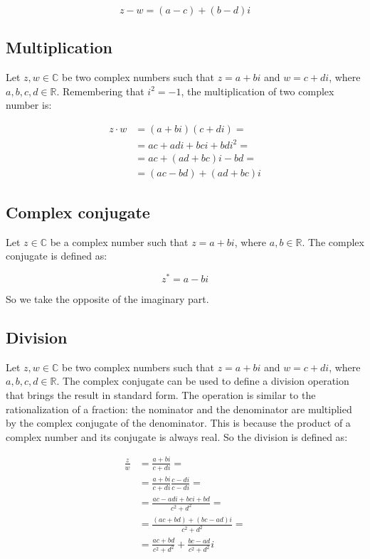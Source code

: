	$$z-w = (a-c) + (b-d)i$$

	\subsection{Multiplication}
	Let $z, w\in\mathbb{C}$ be two complex numbers such that $z = a+bi$ and $w = c+di$, where $a,b,c,d\in\mathbb{R}$.
	Remembering that $i^2 = -1$, the multiplication of two complex number is:

	\begin{align*}
		z\cdot w &= (a+bi)(c+di) = \\
						 &=ac+adi+bci+bdi^2 =\\
						 &= ac+(ad+bc)i -bd =\\
						 &= (ac-bd)+(ad+bc)i
	\end{align*}

	\subsection{Complex conjugate}
	Let $z\in\mathbb{C}$ be a complex number such that $z=a+bi$, where $a,b\in\mathbb{R}$.
	The complex conjugate is defined as:

	$$z^*=a-bi$$

	So we take the opposite of the imaginary part.

	\subsection{Division}
	Let $z, w\in\mathbb{C}$ be two complex numbers such that $z = a+bi$ and $w = c+di$, where $a,b,c,d\in\mathbb{R}$.
	The complex conjugate can be used to define a division operation that brings the result in standard form.
	The operation is similar to the rationalization of a fraction: the nominator and the denominator are multiplied by the complex conjugate of the denominator.
	This is because the product of a complex number and its conjugate is always real.
	So the division is defined as:

	\begin{align*}
		\frac{z}{w} &= \frac{a+bi}{c+di} = \\
								&=\frac{a+bi}{c+di}\frac{c-di}{c-di}=\\
								&=\frac{ac - adi + bci +bd}{c^2+d^2}=\\
								&= \frac{(ac + bd) + (bc - ad)i}{c^2+d^2} = \\
								&=\frac{ac +bd}{c^2+d^2} + \frac{bc-ad}{c^2+d^2}i
	\end{align*}

